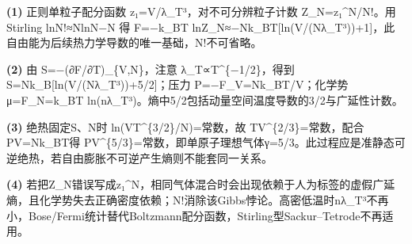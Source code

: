 \par\noindent\textbf{(1)} 正则单粒子配分函数 z₁=V/λ\_T³，对不可分辨粒子计数 Z\_N=z₁\textasciicircum{}N/N!。用 Stirling lnN!≈NlnN−N 得 F=−k\_BT lnZ\_N≈−Nk\_BT[ln(V/(Nλ\_T³))+1]，此自由能为后续热力学导数的唯一基础，N!不可省略。
\par\noindent\textbf{(2)} 由 S=−(∂F/∂T)\_\{V,N\}，注意 λ\_T∝T\textasciicircum{}\{−1/2\}，得到 S=Nk\_B[ln(V/(Nλ\_T³))+5/2]；压力 P=−F\_V=Nk\_BT/V；化学势 μ=F\_N=k\_BT ln(nλ\_T³)。熵中5/2包括动量空间温度导数的3/2与广延性计数。
\par\noindent\textbf{(3)} 绝热固定S、N时 ln(VT\textasciicircum{}\{3/2\}/N)=常数，故 TV\textasciicircum{}\{2/3\}=常数，配合PV=Nk\_BT得 PV\textasciicircum{}\{5/3\}=常数，即单原子理想气体γ=5/3。此过程应是准静态可逆绝热，若自由膨胀不可逆产生熵则不能套同一关系。
\par\noindent\textbf{(4)} 若把Z\_N错误写成z₁\textasciicircum{}N，相同气体混合时会出现依赖于人为标签的虚假广延熵，且化学势失去正确密度依赖；N!消除该Gibbs悖论。高密低温时nλ\_T³不再小，Bose/Fermi统计替代Boltzmann配分函数，Stirling型Sackur–Tetrode不再适用。
